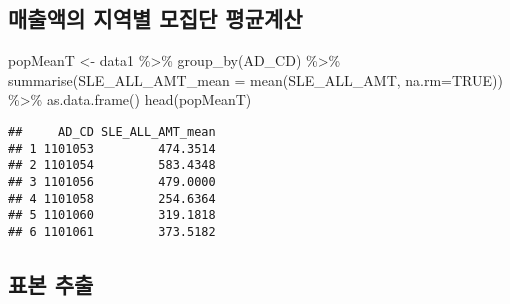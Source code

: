 \documentclass[
]{book}
\newenvironment{Shaded}{\begin{snugshade}}{\end{snugshade}}
\newcommand{\AttributeTok}[1]{\textcolor[rgb]{0.77,0.63,0.00}{#1}}
\newcommand{\ConstantTok}[1]{\textcolor[rgb]{0.00,0.00,0.00}{#1}}
\newcommand{\DecValTok}[1]{\textcolor[rgb]{0.00,0.00,0.81}{#1}}
\newcommand{\FunctionTok}[1]{\textcolor[rgb]{0.00,0.00,0.00}{#1}}
\newcommand{\NormalTok}[1]{#1}
\newcommand{\OtherTok}[1]{\textcolor[rgb]{0.56,0.35,0.01}{#1}}
\newcommand{\SpecialCharTok}[1]{\textcolor[rgb]{0.00,0.00,0.00}{#1}}
\newcommand{\StringTok}[1]{\textcolor[rgb]{0.31,0.60,0.02}{#1}}
\begin{document}
\hypertarget{uxb9e4uxcd9cuxc561uxc758-uxc9c0uxc5eduxbcc4-uxbaa8uxc9d1uxb2e8-uxd3c9uxade0uxacc4uxc0b0}{%
\subsection{매출액의 지역별 모집단 평균계산}\label{uxb9e4uxcd9cuxc561uxc758-uxc9c0uxc5eduxbcc4-uxbaa8uxc9d1uxb2e8-uxd3c9uxade0uxacc4uxc0b0}}

\begin{Shaded}
\begin{Highlighting}[]
\NormalTok{popMeanT }\OtherTok{\textless{}{-}}\NormalTok{ data1 }\SpecialCharTok{\%\textgreater{}\%} \FunctionTok{group\_by}\NormalTok{(AD\_CD)   }\SpecialCharTok{\%\textgreater{}\%}  
  \FunctionTok{summarise}\NormalTok{(}\AttributeTok{SLE\_ALL\_AMT\_mean  =} \FunctionTok{mean}\NormalTok{(SLE\_ALL\_AMT, }\AttributeTok{na.rm=}\ConstantTok{TRUE}\NormalTok{)) }\SpecialCharTok{\%\textgreater{}\%} \FunctionTok{as.data.frame}\NormalTok{()}
\FunctionTok{head}\NormalTok{(popMeanT)}
\end{Highlighting}
\end{Shaded}

\begin{verbatim}
##     AD_CD SLE_ALL_AMT_mean
## 1 1101053         474.3514
## 2 1101054         583.4348
## 3 1101056         479.0000
## 4 1101058         254.6364
## 5 1101060         319.1818
## 6 1101061         373.5182
\end{verbatim}

\hypertarget{uxd45cuxbcf8-uxcd94uxcd9c}{%
\subsection{표본 추출}\label{uxd45cuxbcf8-uxcd94uxcd9c}}

\begin{Shaded}
\end{Shaded}
\end{document}
